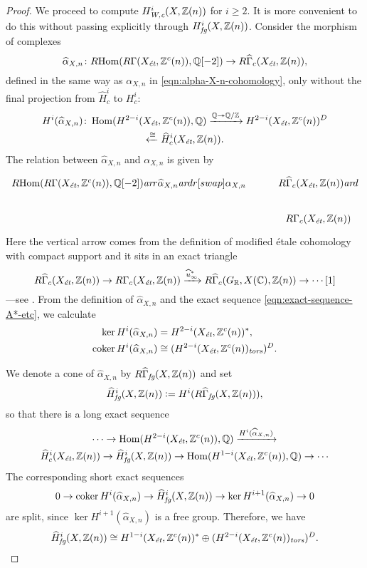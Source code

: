\documentclass{article}
\DeclareMathOperator{\coker}{coker}
\DeclareMathOperator{\Hom}{Hom}
\newcommand{\CC}{\mathbb{C}}
\newcommand{\QQ}{\mathbb{Q}}
\newcommand{\RR}{\mathbb{R}}
\newcommand{\ZZ}{\mathbb{Z}}
\newcommand{\ar}{\text{\it ar}}
\newcommand{\et}{\text{\it \'{e}t}}
\newcommand{\fg}{\text{\it fg}}
\newcommand{\tors}{\text{\it tors}}
\newcommand{\Wc}{\text{\it W,c}}
\newcommand{\dfn}{\mathrel{\mathop:}=}
\newcommand{\RHom}{R\!\Hom}
\theoremstyle{myplain}
\theoremstyle{mydefinition}
\begin{document}
\begin{proof}
  \vspace{1em}

  We proceed to compute $H^i_\Wc (X, \ZZ(n))$ for $i \ge 2$. It is more
  convenient to do this without passing explicitly through
  $H^i_\fg (X, \ZZ(n))$. Consider the morphism of complexes
  \[ \widehat{\alpha}_{X,n}\colon
    \RHom (R\Gamma (X_\et, \ZZ^c(n)), \QQ[-2]) \to
    R\widehat{\Gamma}_c (X_\et, \ZZ(n)), \]
  defined in the same way as $\alpha_{X,n}$ in \eqref{eqn:alpha-X-n-cohomology},
  only without the final projection from $\widehat{H}^i_c$ to $H^i_c$:
  \begin{multline*}
    H^i (\widehat{\alpha}_{X,n})\colon \Hom (H^{2-i} (X_\et, \ZZ^c(n)), \QQ)
    \xrightarrow{\QQ \twoheadrightarrow \QQ/\ZZ}
    H^{2-i} (X_\et, \ZZ^c(n))^D \\
    \xleftarrow{\cong} \widehat{H}^i_c (X_\et, \ZZ(n)).
  \end{multline*}
  The relation between $\widehat{\alpha}_{X,n}$ and $\alpha_{X,n}$
  is given by
  \[ \begin{tikzcd}
      \RHom (R\Gamma (X_\et, \ZZ^c(n)), \QQ[-2]) \ar{r}{\widehat{\alpha}_{X,n}}\ar{dr}[swap]{\alpha_{X,n}} & R\widehat{\Gamma}_c (X_\et, \ZZ(n)) \ar{d} \\
      & R\Gamma_c (X_\et, \ZZ(n))
    \end{tikzcd} \]
  Here the vertical arrow comes from the definition of modified \'{e}tale
  cohomology with compact support and it sits in an exact triangle
  \[ R\widehat{\Gamma}_c (X_\et, \ZZ(n)) \to
    R\Gamma_c (X_\et, \ZZ(n)) \xrightarrow{\widehat{u}^*_\infty}
    R\widehat{\Gamma}_c (G_\RR, X(\CC), \ZZ(n)) \to \cdots [1] \]
  ---see \cite[Lemma~6.14]{Flach-Morin-2018}.
  From the definition of $\widehat{\alpha}_{X,n}$ and the exact sequence
  \eqref{eqn:exact-sequence-A*-etc}, we calculate
  \begin{align*}
    \ker H^i (\widehat{\alpha}_{X,n}) & = H^{2-i} (X_\et, \ZZ^c(n))^*, \\
    \coker H^i (\widehat{\alpha}_{X,n}) & \cong (H^{2-i} (X_\et, \ZZ^c (n))_\tors)^D.
  \end{align*}

  We denote a cone of $\widehat{\alpha}_{X,n}$ by
  $R\widehat{\Gamma}_\fg (X, \ZZ(n))$ and set
  $$\widehat{H}^i_\fg (X, \ZZ(n)) \dfn H^i (R\widehat{\Gamma}_\fg (X, \ZZ(n))),$$
  so that there is a long exact sequence
  \begin{multline*}
    \cdots \to \Hom (H^{2-i} (X_\et, \ZZ^c (n)), \QQ) \xrightarrow{H^i (\widehat{\alpha}_{X,n})} \\
    \widehat{H}^i_c (X_\et, \ZZ(n)) \to
    \widehat{H}^i_\fg (X, \ZZ(n)) \to
    \Hom (H^{1-i} (X_\et, \ZZ^c (n)), \QQ) \to \cdots
  \end{multline*}
  The corresponding short exact sequences
  \[ 0 \to \coker H^i (\widehat{\alpha}_{X,n}) \to
    \widehat{H}^i_\fg (X, \ZZ(n)) \to
    \ker H^{i+1} (\widehat{\alpha}_{X,n}) \to 0 \]
  are split, since $\ker H^{i+1} (\widehat{\alpha}_{X,n})$ is a free
  group. Therefore, we have
  \[ \widehat{H}^i_\fg (X, \ZZ(n)) \cong
    H^{1-i} (X_\et, \ZZ^c(n))^*
    \oplus
    (H^{2-i} (X_\et, \ZZ^c (n))_\tors)^D. \]


\end{proof}
\end{document}

